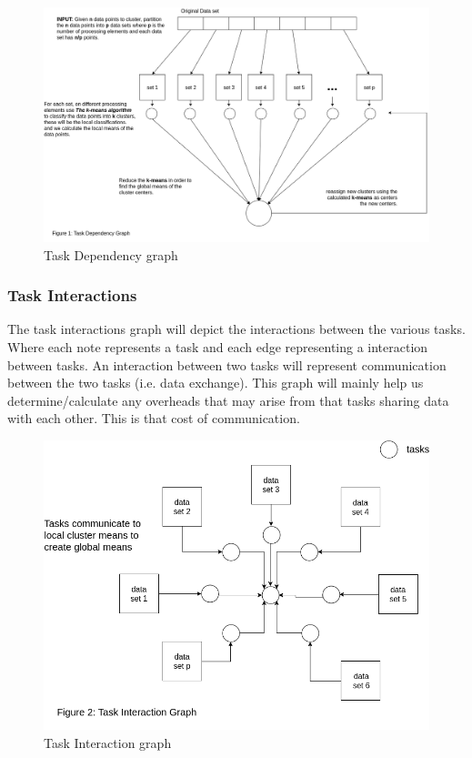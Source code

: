 \documentclass[12pt]{article}
\begin{document}
    			\begin{figure}
    				\begin{center}
    					\includegraphics[scale=0.3]{task_dependency_graph_2.png}
    				\end{center}
    				\caption{Task Dependency graph}
    			\end{figure}
    		
    		\subsubsection{Task Interactions}
    			\begin{flushleft}
    				The task interactions graph will depict the interactions between the various tasks. Where each note represents a task and each edge representing a interaction between tasks. An interaction between two tasks will represent communication between the two tasks (i.e. data exchange). This graph will mainly help us determine/calculate any overheads that may arise from that tasks sharing data with each other. This is that cost of communication.
    			\end{flushleft}
    			
    			\begin{figure}
    				\begin{center}
    					\includegraphics[scale=0.3]{task_interaction_3.png}
    				\end{center}
    				\caption{Task Interaction graph}
    			\end{figure}
    			
\end{document}
